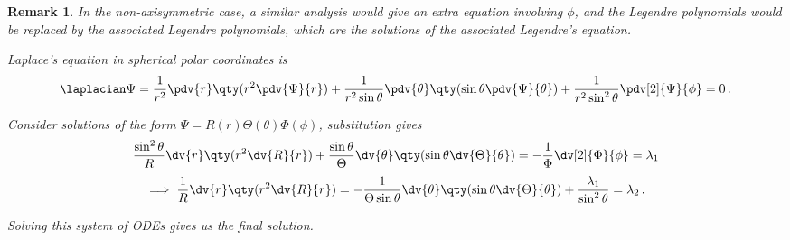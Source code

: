 \documentclass{article}
\theoremstyle{plain}\theoremheaderfont{\normalfont\itshape}\theorembodyfont{\rmfamily}\theoremseparator{.}\newtheorem*{rem}{Remark}\newtheorem*{ex}{Example}\newtheorem*{proof}{Proof}\newtheorem*{altp}{Alternative proof}
\theoremstyle{plain}\theoremheaderfont{\normalfont\bfseries}\theorembodyfont{\rmfamily}\theoremseparator{.}\newtheorem{thm}{Theorem}[section]\newtheorem{lem}[thm]{Lemma}\newtheorem{prop}[thm]{Proposition}\newtheorem*{cor}{Corollary}\newtheorem{defn}[thm]{Definition}\newtheorem{clm}[thm]{Claim}\newtheorem{clminproof}{Claim}
\theoremstyle{break}\theoremheaderfont{\normalfont\itshape}\theorembodyfont{\rmfamily}\theoremseparator{.\medskip}\newtheorem*{proofskip}{Proof}\newtheorem*{exs}{Examples}\newtheorem*{rems}{Remarks}
\theoremstyle{break}\theoremheaderfont{\normalfont\bfseries}\theorembodyfont{\rmfamily}\theoremseparator{.\medskip}\newtheorem{lemskip}[thm]{Lemma}\newtheorem{defnskip}[thm]{Definition}\newtheorem{propskip}[thm]{Proposition}\newtheorem{thmskip}[thm]{Theorem}
\numberwithin{equation}{section}
\begin{document}
	\begin{rem}
		In the non-axisymmetric case, a similar analysis would give an extra equation involving \(\phi\), and the Legendre polynomials would be replaced by the \textit{associated Legendre polynomials}, which are the solutions of the \textit{associated Legendre's equation}.
		
		Laplace's equation in spherical polar coordinates is
		\[\laplacian\Psi=\frac{1}{r^2}\pdv{r}\qty(r^2\pdv{\Psi}{r})+\frac{1}{r^2\sin\theta}\pdv{\theta}\qty(\sin\theta\pdv{\Psi}{\theta})+\frac{1}{r^2\sin^2\theta}\pdv[2]{\Psi}{\phi}=0\,.\]

		Consider solutions of the form \(\Psi=R(r)\Theta(\theta)\Phi(\phi)\), substitution gives
		\[\frac{\sin^2\theta}{R}\dv{r}\qty(r^2\dv{R}{r})+\frac{\sin\theta}{\Theta}\dv{\theta}\qty(\sin\theta\dv{\Theta}{\theta})=-\frac{1}{\Phi}\dv[2]{\Phi}{\phi}=\lambda_1\]
		\[\implies \frac{1}{R}\dv{r}\qty(r^2\dv{R}{r})=-\frac{1}{\Theta\sin\theta}\dv{\theta}\qty(\sin\theta\dv{\Theta}{\theta})+\frac{\lambda_1}{\sin^2\theta}=\lambda_2\,.\]

		Solving this system of ODEs gives us the final solution.
	\end{rem}
\end{document}
